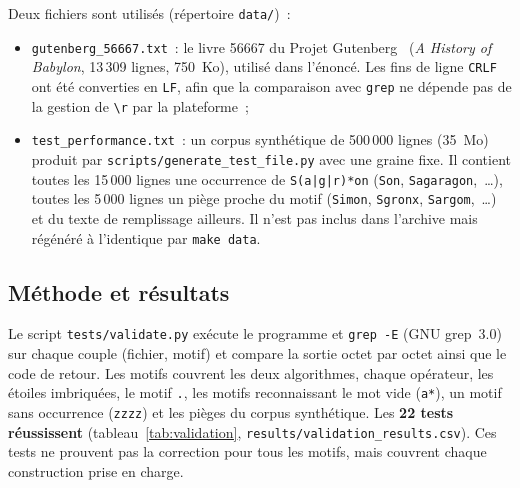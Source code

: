 \documentclass[11pt,a4paper]{article}
\begin{document}
Deux fichiers sont utilisés (répertoire \texttt{data/})~:
\begin{itemize}
  \item \texttt{gutenberg\_56667.txt}~: le livre 56667 du Projet
    Gutenberg~\cite{ProjectGutenberg} (\emph{A History of Babylon},
    13\,309 lignes, 750~Ko), utilisé dans l'énoncé. Les fins de ligne
    \texttt{CRLF} ont été converties en \texttt{LF}, afin que la comparaison
    avec \texttt{grep} ne dépende pas de la gestion de \texttt{\textbackslash r}
    par la plateforme~;
  \item \texttt{test\_performance.txt}~: un corpus synthétique de
    500\,000 lignes (35~Mo) produit par \texttt{scripts/generate\_test\_file.py}
    avec une graine fixe. Il contient toutes les 15\,000 lignes une occurrence
    de \texttt{S(a|g|r)*on} (\texttt{Son}, \texttt{Sagaragon},~\dots), toutes
    les 5\,000 lignes un piège proche du motif (\texttt{Simon},
    \texttt{Sgronx}, \texttt{Sargom},~\dots) et du texte de remplissage
    ailleurs. Il n'est pas inclus dans l'archive mais régénéré à l'identique
    par \texttt{make data}.
\end{itemize}

\subsection{Méthode et résultats}

Le script \texttt{tests/validate.py} exécute le programme et
\texttt{grep -E} (GNU grep~3.0) sur chaque couple (fichier, motif) et compare
la sortie octet par octet ainsi que le code de retour. Les motifs couvrent les
deux algorithmes, chaque opérateur, les étoiles imbriquées, le motif
\texttt{.}, les motifs reconnaissant le mot vide (\texttt{a*}), un motif sans
occurrence (\texttt{zzzz}) et les pièges du corpus synthétique.
Les \textbf{22 tests réussissent} (tableau~\ref{tab:validation},
\texttt{results/validation\_results.csv}). Ces tests ne prouvent pas la
correction pour tous les motifs, mais couvrent chaque construction prise en
charge.
\end{document}
